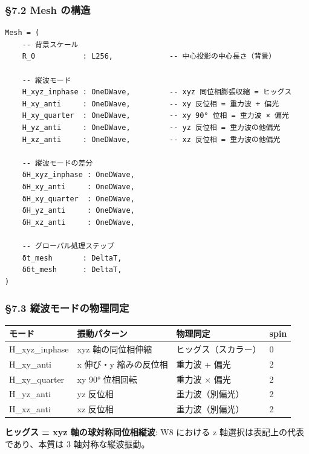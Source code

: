 \documentclass[a4paper,11pt]{ltjsarticle}
\newcounter{none}
\begin{document}
\subsubsection{§7.2 Mesh の構造}\label{mesh-ux306eux69cbux9020}

\begin{verbatim}
Mesh = (
    -- 背景スケール
    R_0           : L256,             -- 中心投影の中心長さ（背景）
    
    -- 縦波モード
    H_xyz_inphase : OneDWave,         -- xyz 同位相膨張収縮 = ヒッグス
    H_xy_anti     : OneDWave,         -- xy 反位相 = 重力波 + 偏光
    H_xy_quarter  : OneDWave,         -- xy 90° 位相 = 重力波 × 偏光
    H_yz_anti     : OneDWave,         -- yz 反位相 = 重力波の他偏光
    H_xz_anti     : OneDWave,         -- xz 反位相 = 重力波の他偏光
    
    -- 縦波モードの差分
    δH_xyz_inphase : OneDWave,
    δH_xy_anti     : OneDWave,
    δH_xy_quarter  : OneDWave,
    δH_yz_anti     : OneDWave,
    δH_xz_anti     : OneDWave,
    
    -- グローバル処理ステップ
    δt_mesh       : DeltaT,
    δδt_mesh      : DeltaT,
)
\end{verbatim}

\subsubsection{§7.3
縦波モードの物理同定}\label{ux7e26ux6ce2ux30e2ux30fcux30c9ux306eux7269ux7406ux540cux5b9a}

{\def\LTcaptype{none} %
\begin{longtable}[]{@{}llll@{}}
\toprule\noalign{}
モード & 振動パターン & 物理同定 & spin \\
\midrule\noalign{}
\endhead
\bottomrule\noalign{}
\endlastfoot
H\_xyz\_inphase & xyz 軸の同位相伸縮 & ヒッグス（スカラー） & 0 \\
H\_xy\_anti & x 伸び・y 縮みの反位相 & 重力波 + 偏光 & 2 \\
H\_xy\_quarter & xy 90° 位相回転 & 重力波 × 偏光 & 2 \\
H\_yz\_anti & yz 反位相 & 重力波（別偏光） & 2 \\
H\_xz\_anti & xz 反位相 & 重力波（別偏光） & 2 \\
\end{longtable}
}

\textbf{ヒッグス = xyz 軸の球対称同位相縦波}: W8 における z
軸選択は表記上の代表であり、本質は 3 軸対称な縦波振動。
\end{document}
